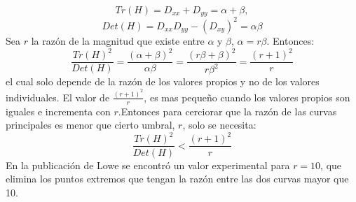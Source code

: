 		$$Tr(H) = D_{xx} + D_{yy} = \alpha+\beta,$$ $$Det(H) = D_{xx}D_{yy}-(D_{xy})^2= \alpha\beta$$
		Sea $r$ la razón de la magnitud que existe entre $\alpha$ y $\beta$, $\alpha = r\beta$. Entonces:
		$$\frac{Tr(H)^2}{Det(H)}= \frac{(\alpha+\beta)^2}{\alpha\beta}= \frac{(r\beta+\beta)^2}{r\beta^2}= \frac{(r+1)^2}{r}$$
		el cual solo depende de la razón de los valores propios y no de los valores individuales. El valor de $\frac{(r+1)^2}{r}$, es mas pequeño cuando los valores propios son iguales e incrementa con $r$.Entonces para cerciorar que la razón de las curvas principales es menor que cierto umbral, $r$, solo se necesita:
		$$\frac{Tr(H)^2}{Det(H)} < \frac{(r+1)^2}{r}$$
		En la publicación de Lowe \cite{Lowe2004} se encontró un valor experimental para $r=10$, que elimina los puntos extremos que tengan la razón entre las dos curvas mayor que 10.
	
	
